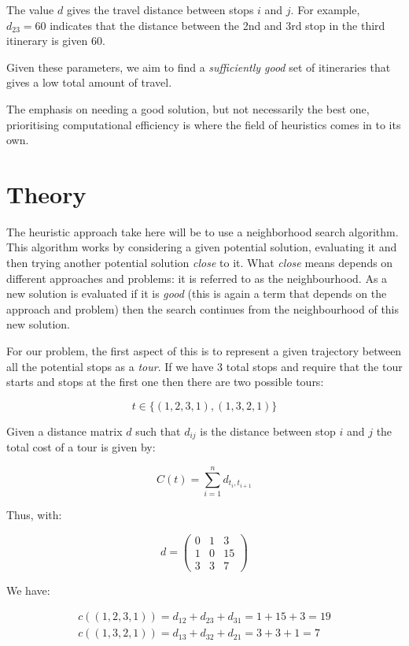 The value \(d\) gives the travel distance between
stops \(i\) and \(j\). For example, \(d_{23}=60\) %
indicates that the distance between the 2nd and 3rd stop in the third itinerary
is given 60. %

Given these parameters, we aim to find a \emph{sufficiently good} set of
itineraries that gives a low total amount of travel.

The emphasis on needing a good solution, but not necessarily the best one,
prioritising computational efficiency is where the field of heuristics comes in
to its own.

\section{Theory}\label{sec:theory}

The heuristic approach take here will be to use a neighborhood search algorithm.
This algorithm works by considering a given potential solution, evaluating it
and then trying another potential solution \emph{close} to it. What \emph{close}
means depends on different approaches and problems: it is referred to as the
neighbourhood. As a new solution is evaluated if it is \emph{good} (this is
again a term that depends on the approach and problem) then the search
continues from the neighbourhood of this new solution.

For our problem,
the first aspect of this is to represent a given trajectory between all the
potential stops as a \emph{tour}. If we have 3 total stops and require that the
tour starts and stops at the first one then there are two possible tours:

\[
    t \in \{(1, 2, 3, 1), (1, 3, 2, 1)\}
\]

Given a distance matrix \(d\) such that \(d_{ij}\) is the distance between stop
\(i\) and \(j\) the total cost of a tour is given by:

\[
    C(t)=\sum_{i=1}^{n} d_{t_i, t_{i + 1}}
\]

Thus, with:

\[
    d = \begin{pmatrix}
        0 & 1 & 3\\
        1 & 0 & 15\\
        3 & 3 & 7
        \end{pmatrix}
\]

We have:

\begin{eqnarray*}
    c((1, 2, 3, 1)) = d_{12} + d_{23} + d_{31} = 1 + 15 + 3 = 19\\
    c((1, 3, 2, 1)) = d_{13} + d_{32} + d_{21} = 3 + 3 + 1 = 7
\end{eqnarray*}

